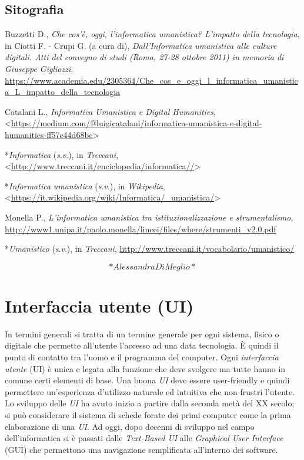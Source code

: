 \documentclass[
  b5paper,
  twoside,
  11pt,
  chapterprefix=false,
  bibliography=totocnumbered,
  listof=flat]{scrbook}
\begin{document}
\hypertarget{sitografia-16}{%
\section*{Sitografia}\label{sitografia-16}}

Buzzetti D., \emph{Che cos'è, oggi, l'informatica umanistica? L'impatto della
tecnologia}, in Ciotti F. - Crupi G. (a cura di), \emph{Dall'Informatica
umanistica alle culture digitali. Atti del convegno di studi (Roma,
27-28 ottobre 2011) in memoria di Giuseppe Gigliozzi},
\href{https://www.academia.edu/2305364/Che_cos_e_oggi_l_informatica_umanistica_L_impatto_della_tecnologia}{{https://www.academia.edu/2305364/Che\_cos\_e\_oggi\_l\_informatica\_umanistica\_L\_impatto\_della\_tecnologia}}

Catalani L., \emph{Informatica Umanistica e Digital Humanities},
\textless{}\href{https://medium.com/@luigicatalani/informatica-umanistica-e-digital-humanities-ff57c44d68be}{{https://medium.com/@luigicatalani/informatica-umanistica-e-digital-humanities-ff57c44d68be}}\textgreater{}

*\emph{Informatica} (\emph{s}.\emph{v}.), in \emph{Treccani},
\textless{}\url{http://www.treccani.it/enciclopedia/informatica//}\textgreater{}

*\emph{Informatica} \emph{umanistica} (\emph{s}.\emph{v}.), in \emph{Wikipedia},
\textless{}\url{https://it.wikipedia.org/wiki/Informatica/_umanistica/}\textgreater{}

Monella P., \emph{L'informatica umanistica tra istituzionalizzazione e
strumentalismo},
\href{http://www1.unipa.it/paolo.monella/lincei/files/where/strumenti_v2.0.pdf}{{http://www1.unipa.it/paolo.monella/lincei/files/where/strumenti\_v2.0.pdf}}

*\emph{Umanistico} (\emph{s}.\emph{v}.), in \emph{Treccani},
\href{http://www.treccani.it/vocabolario/umanistico/}{{http://www.treccani.it/vocabolario/umanistico/}}

\[*Alessandra Di Meglio*\]

\hypertarget{interfaccia-utente-ui}{%
\chapter{Interfaccia utente (UI)}\label{interfaccia-utente-ui}}

In termini generali si tratta di un termine generale per ogni sistema,
fisico o digitale che permette all'utente l'accesso ad una data
tecnologia. È quindi il punto di contatto tra l'uomo e il programma del
computer. Ogni \emph{interfaccia utente} (UI) è unica e legata alla funzione
che deve svolgere ma tutte hanno in comune certi elementi di base. Una
buona \emph{UI} deve essere user-friendly e quindi permettere un'esperienza
d'utilizzo naturale ed intuitiva che non frustri l'utente. Lo sviluppo
delle \emph{UI} ha avuto inizio a partire dalla seconda metà del XX secolo;
si può considerare il sistema di schede forate dei primi computer come
la prima elaborazione di una \emph{UI}. Ad oggi, dopo decenni di sviluppo nel
campo dell'informatica si è passati dalle \emph{Text-Based UI} alle
\emph{Graphical User Interface} (GUI) che permettono una navigazione
semplificata all'interno dei software.
\end{document}
